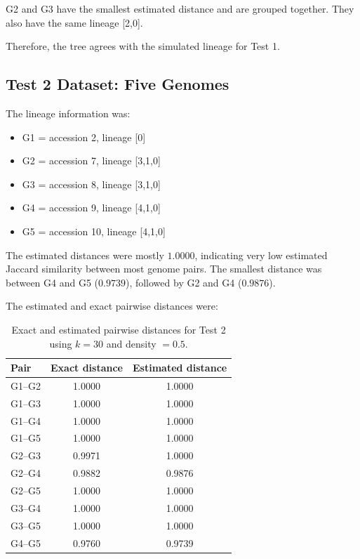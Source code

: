 \documentclass[11pt,a4paper]{article}
\begin{document}
G2 and G3 have the smallest estimated distance and are grouped together.
They also have the same lineage [2,0].

Therefore, the tree agrees with the simulated lineage for Test 1.


\subsection{Test 2 Dataset: Five Genomes}

The lineage information was:

\begin{itemize}
    \item G1 = accession 2, lineage [0]
    \item G2 = accession 7, lineage [3,1,0]
    \item G3 = accession 8, lineage [3,1,0]
    \item G4 = accession 9, lineage [4,1,0]
    \item G5 = accession 10, lineage [4,1,0]
\end{itemize}

The estimated distances were mostly $1.0000$, indicating very low estimated Jaccard similarity between most genome pairs. The smallest distance was between G4 and G5 ($0.9739$), followed by G2 and G4 ($0.9876$).

The estimated and exact pairwise distances  were:
\begin{table}[h]
\centering
\begin{tabular}{lcc}
\hline
\textbf{Pair} & \textbf{Exact distance} & \textbf{Estimated distance} \\
\hline
G1--G2 & 1.0000 & 1.0000 \\
G1--G3 & 1.0000 & 1.0000 \\
G1--G4 & 1.0000 & 1.0000 \\
G1--G5 & 1.0000 & 1.0000 \\
G2--G3 & 0.9971 & 1.0000 \\
G2--G4 & 0.9882 & 0.9876 \\
G2--G5 & 1.0000 & 1.0000 \\
G3--G4 & 1.0000 & 1.0000 \\
G3--G5 & 1.0000 & 1.0000 \\
G4--G5 & 0.9760 & 0.9739 \\
\hline
\end{tabular}
\caption{Exact and estimated pairwise distances for Test 2 using
$k=30$ and density $=0.5$.}
\label{tab:test2_distances}
\end{table}
\end{document}
